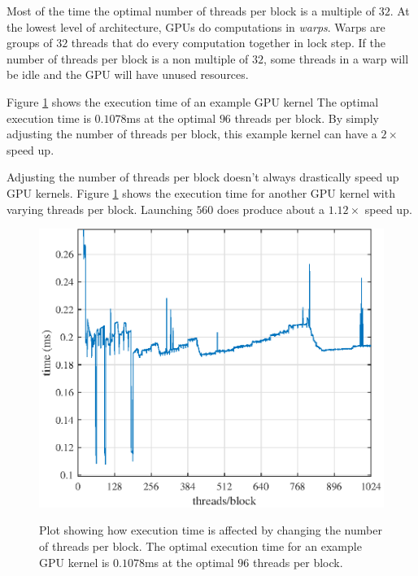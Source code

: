 Most of the time the optimal number of threads per block is a multiple of $32$. 
At the lowest level of architecture, GPUs do computations in \textit{warps}.
Warps are groups of $32$ threads that do every computation together in lock step.
If the number of threads per block is a non multiple of $32$, some threads in a warp will be idle and the GPU will have unused resources.


Figure \ref{fig:ConvGPU_shared_12672_186taps} shows the execution time of an example GPU kernel
The optimal execution time is $0.1078$ms at the optimal $96$ threads per block.
By simply adjusting the number of threads per block, this example kernel can have a $2\times$ speed up.

Adjusting the number of threads per block doesn't always drastically speed up GPU kernels.
Figure \ref{fig:ConvGPU_shared_12672_186taps} shows the execution time for another GPU kernel with varying threads per block.
Launching $560$ does produce about a $1.12\times$ speed up.
\begin{figure}
	\caption{Plot showing how execution time is affected by changing the number of threads per block.
	The optimal execution time for an example GPU kernel is $0.1078$ms at the optimal $96$ threads per block.}
	\centering\includegraphics[width=5in]{figures/gpu_intro/ConvGPU_shared_12672_186taps.eps}
	\label{fig:ConvGPU_shared_12672_186taps}
\end{figure}
